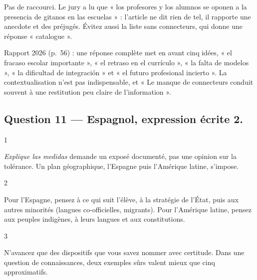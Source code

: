 \documentclass[11pt,a4paper]{article}
\begin{document}
\begin{piege}

Pas de raccourci. Le jury a lu que « los profesores y los alumnos se oponen a la presencia de gitanos en las escuelas » : l'article ne dit rien de tel, il rapporte une anecdote et des préjugés. Évitez aussi la liste sans connecteurs, qui donne une réponse « catalogue ».

\end{piege}

\begin{jury}

Rapport 2026 (p.~56) : une réponse complète met en avant cinq idées, « el fracaso escolar importante », « el retraso en el currículo », « la falta de modelos », « la dificultad de integración » et « el futuro profesional incierto ». La contextualisation n'est pas indispensable, et « Le manque de connecteurs conduit souvent à une restitution peu claire de l'information ».

\end{jury}

\hypertarget{question-11-espagnol-expression-uxe9crite-2.}{%
\subsection{Question 11 --- Espagnol, expression écrite 2.}\label{question-11-espagnol-expression-uxe9crite-2.}}

\begin{indication}{1}

\emph{Explique las medidas} demande un exposé documenté, pas une opinion sur la tolérance. Un plan géographique, l'Espagne puis l'Amérique latine, s'impose.

\end{indication}

\begin{indication}{2}

Pour l'Espagne, pensez à ce qui suit l'élève, à la stratégie de l'État, puis aux autres minorités (langues co-officielles, migrants). Pour l'Amérique latine, pensez aux peuples indigènes, à leurs langues et aux constitutions.

\end{indication}

\begin{indication}{3}

N'avancez que des dispositifs que vous savez nommer avec certitude. Dans une question de connaissances, deux exemples sûrs valent mieux que cinq approximatifs.

\end{indication}
\end{document}
